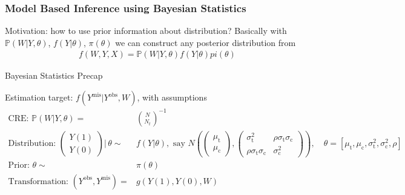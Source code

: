 \subsubsection{Model Based Inference using Bayesian Statistics}
Motivation: how to use prior information about distribution? Basically with $ \mathbb{P}\left( W|Y,\theta  \right)  $, $ f(Y|\theta ) $, $ \pi(\theta ) $ we can construct any posterior distribution from 
\begin{align*}
    f(W,Y,X)= \mathbb{P}\left( W|Y,\theta  \right)f(Y|\theta )pi(\theta )
\end{align*}


\begin{point}
    Bayesian Statistics Precap
\end{point}

Estimation target: $ f(Y^\mathrm{mis}|Y^\mathrm{obs},W ) $, with assumptions
\begin{align*}
    \text{CRE: }\mathbb{P}\left( W|Y,\theta  \right)=&\binom{N}{N_t} ^{-1}\\
    \text{Distribution: }\begin{pmatrix}
        Y(1)\\
        Y(0)
    \end{pmatrix}\Big|\,\theta \sim & f(Y|\theta ),\text{ say } N\left(\begin{pmatrix}
        \mu _\mathrm{t}\\
        \mu _\mathrm{c}      
    \end{pmatrix},\begin{pmatrix}
        \sigma _\mathrm{t}^2& \rho \sigma_\mathrm{t}\sigma _\mathrm{c}\\
        \rho \sigma _\mathrm{t}  \sigma _\mathrm{c}&\sigma _\mathrm{c}^2     
    \end{pmatrix}\right),\quad \theta =[\mu _\mathrm{t},\mu _\mathrm{c} ,\sigma^2_\mathrm{t},\sigma ^2_\mathrm{c} ,\rho ]\\
    \text{Prior: }\theta \sim & \pi (\theta  )\\
    \text{Transformation: }(Y^\mathrm{obs},Y^\mathrm{mis}  )=&g\left(Y(1),Y(0),W\right)
\end{align*}


